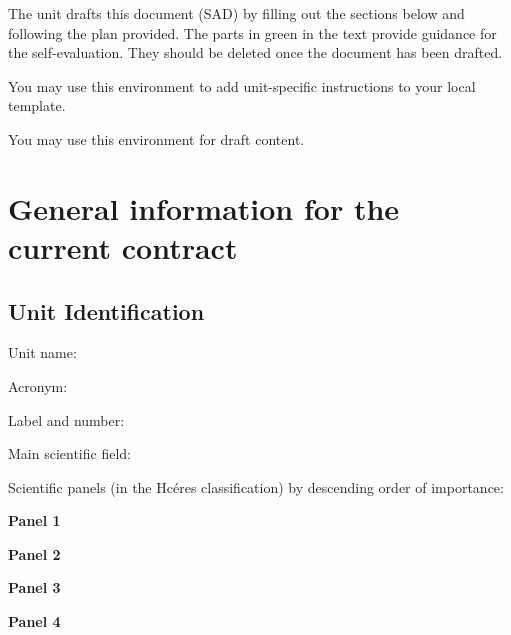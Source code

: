 %


\begin{hceresinstructions}
  The unit drafts this document (SAD) by filling out the sections below
  and following the plan provided. The parts in green in the text provide
  guidance for the self-evaluation. They should be deleted once the
  document has been drafted.
\end{hceresinstructions}

\begin{extrainstructions}
  You may use this environment to add unit-specific instructions to your local
  template.
\end{extrainstructions}

\begin{draft}
  You may use this environment for draft content.
\end{draft}

\cite{DUMMY1}

\section{General information for the current contract}


\subsection{Unit Identification}

Unit name:

Acronym:

Label and number:

Main scientific field:

Scientific panels (in the Hcéres classification) by descending order of
importance:

\textbf{Panel 1}

\textbf{Panel 2}

\textbf{Panel 3}

\textbf{Panel 4}

